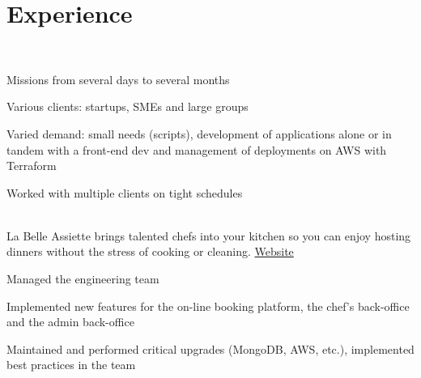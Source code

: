 \documentclass[
  english,
  a4paper
]{resume-openfont}
\begin{document}
\hfill%
\begin{minipage}[t]{0.66\textwidth}


\section{Experience}

%
\\
\vspace{0.5\topsep}
\begin{tightemize}
\item Missions from several days to several months
\item Various clients: startups, SMEs and large groups
\item Varied demand: small needs (scripts), development of applications alone or in tandem with a front-end dev and management of deployments on AWS with Terraform
\item Worked with multiple clients on tight schedules
\end{tightemize}
\sectionsep


%
%
\\
La Belle Assiette brings talented chefs into your kitchen so you can enjoy hosting dinners without the stress of cooking or cleaning. \href{https://labelleassiette.co.uk}{Website}
\vspace{\topsep}
\begin{tightemize}
\item Managed the engineering team
\item Implemented new features for the on-line booking platform, the chef's back-office and the admin back-office
\item Maintained and performed critical upgrades (MongoDB, AWS, etc.), implemented best practices in the team
\end{tightemize}
\sectionsep


\end{minipage}
\end{document}

